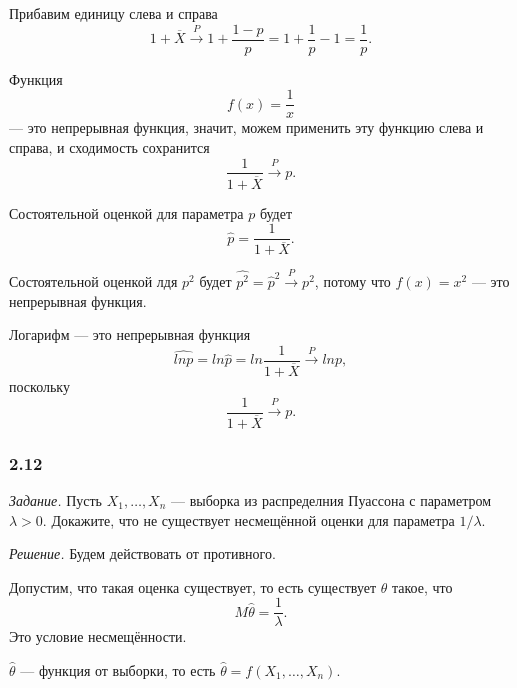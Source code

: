 Прибавим единицу слева и справа
$$1 + \overline{X} \overset{P}{ \to }
  1 + \frac{1 - p}{p} =
  1 + \frac{1}{p} - 1 =
  \frac{1}{p}.$$

Функция
$$f \left( x \right) =
  \frac{1}{x}$$
--- это непрерывная функция, значит, можем применить эту функцию слева и справа,
и сходимость сохранится
$$ \frac{1}{1 + \overline{X}} \overset{P}{ \to }
  p.$$

Состоятельной оценкой для параметра $p$ будет
$$ \hat{p} =
  \frac{1}{1 + \overline{X}}.$$

Состоятельной оценкой лдя $p^2$ будет $ \hat{p^2} = \hat{p}^2 \overset{P}{ \to } p^2$,
потому что $f \left( x \right) = x^2$ --- это непрерывная функция.

Логарифм --- это непрерывная функция
$$ \hat{ln p} =
  ln \hat{p} =
  ln \frac{1}{1 + \overline{X}} \overset{P}{ \to }
  ln p,$$
поскольку
$$ \frac{1}{1 + \overline{X}} \overset{P}{ \to }
  p.$$

\subsubsection*{2.12}

\textit{Задание.}
Пусть $X_1, \dotsc, X_n$ --- выборка из распределния Пуассона с параметром $ \lambda > 0$.
Докажите, что не существует несмещённой оценки для параметра $1 / \lambda $.

\textit{Решение.} Будем действовать от противного.

Допустим, что такая оценка существует, то есть существует $ \hat{ \theta }$ такое, что
$$M \hat{ \theta } =
  \frac{1}{ \lambda }.$$
Это условие несмещённости.

$ \hat{ \theta }$ --- функция от выборки,
то есть $ \hat{ \theta } = f \left( X_1, \dotsc, X_n \right) $.

